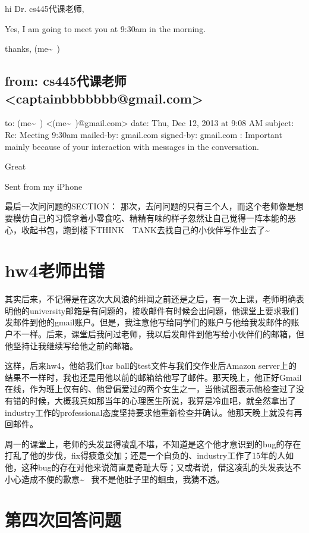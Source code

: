 \documentclass[12pt]{book}
\begin{document}
hi Dr. cs445代课老师, 

Yes, I am going to meet you at 9:30am in the morning. 

thanks,
(me\textasciitilde{}~)

\section{from:         cs445代课老师 <captainbbbbbbb@gmail.com>}
\label{sec-3-2}
to:         (me\textasciitilde{}~) <(me\textasciitilde{}~)@gmail.com>
date:         Thu, Dec 12, 2013 at 9:08 AM
subject:         Re: Meeting 9:30am
mailed-by:         gmail.com
signed-by:         gmail.com
:         Important mainly because of your interaction with messages in the conversation.

Great

Sent from my iPhone

最后一次问问题的SECTION：
那次，去问问题的只有三个人，而这个老师像是想要模仿自己的习惯拿着小零食吃、精精有味的样子忽然让自己觉得一阵本能的恶心，收起书包，跑到楼下THINK　TANK去找自己的小伙伴写作业去了\textasciitilde{}~

\chapter{hw4老师出错}
\label{sec-4}

其实后来，不记得是在这次大风浪的绯闻之前还是之后，有一次上课，老师明确表明他的university邮箱是有问题的，接收邮件有时候会出问题，他课堂上要求我们发邮件到他的gmail账户。但是，我注意他写给同学们的账户与他给我发邮件的账户不一样。后来，课堂后我问过老师，我以后发邮件到他写给小伙伴们的邮箱，但他坚持让我继续写给他之前的邮箱。

这样，后来hw4，他给我们tar ball的test文件与我们交作业后Amazon server上的结果不一样时，我也还是用他以前的邮箱给他写了邮件。那天晚上，他正好Gmail在线，作为班上仅有的、他曾偏爱过的两个女生之一，当他试图表示他检查过了没有错的时候，大概我真如那当年的心理医生所说，我算是冷血吧，就全然拿出了industry工作的professional态度坚持要求他重新检查并确认。他那天晚上就没有再回邮件。

周一的课堂上，老师的头发显得凌乱不堪，不知道是这个他才意识到的bug的存在打乱了他的步伐，fix得疲惫交加；还是一个自负的、industry工作了15年的人如他，这种bug的存在对他来说简直是奇耻大辱；又或者说，借这凌乱的头发表达不小心造成不便的歉意\textasciitilde{}~ 我不是他肚子里的蛔虫，我猜不透。

\chapter{第四次回答问题}
\label{sec-5}
\end{document}
